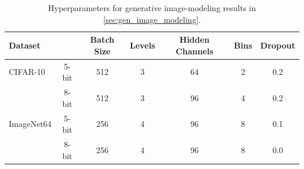 \begin{table}[h!]
	\caption{Hyperparameters for generative image-modeling results in \cref{sec:gen_image_modeling}.}
	\label{tab:experimental-details-images}
	\vspace*{-0.1in}
	\begin{center}
		\begin{small}
			\begin{sc}
				\begin{tabular}{lcccccc}
					\toprule
					Dataset && Batch Size & Levels & Hidden Channels & Bins & Dropout \\ 
					\midrule
					CIFAR-10 & 5-bit & 512 & 3 & 64 & 2 & 0.2\\
					& 8-bit & 512 & 3 & 96 & 4 & 0.2\\
					ImageNet64 & 5-bit & 256 & 4 & 96 & 8 & 0.1\\
					& 8-bit & 256 & 4 & 96 & 8 & 0.0\\
					\bottomrule
				\end{tabular}
			\end{sc}
		\end{small}
	\end{center}
\end{table}
